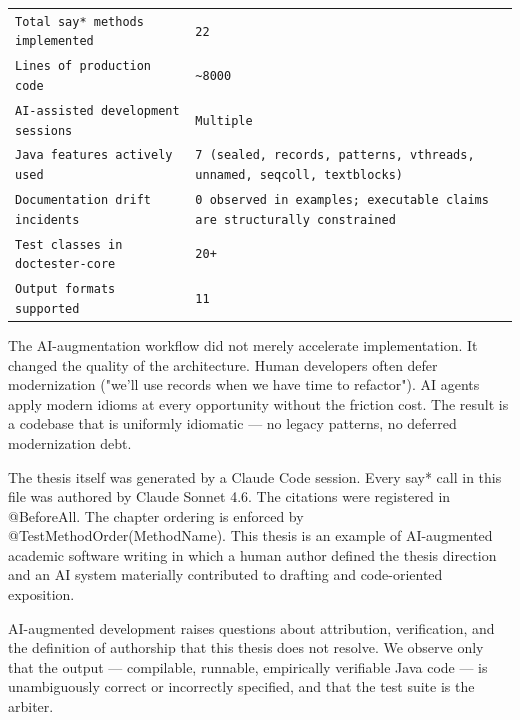 \documentclass[11pt]{article}
\begin{document}
\begin{table}[h]
\centering
\begin{tabular}{|l|l|}
\hline
\texttt{Total say* methods implemented} & \texttt{22} \\
\texttt{Lines of production code} & \texttt{\textasciitilde{}8000} \\
\texttt{AI-assisted development sessions} & \texttt{Multiple} \\
\texttt{Java features actively used} & \texttt{7 (sealed, records, patterns, vthreads, unnamed, seqcoll, textblocks)} \\
\texttt{Documentation drift incidents} & \texttt{0 observed in examples; executable claims are structurally constrained} \\
\texttt{Test classes in doctester-core} & \texttt{20+} \\
\texttt{Output formats supported} & \texttt{11} \\
\hline
\end{tabular}
\end{table}


The AI-augmentation workflow did not merely accelerate implementation. It changed the quality of the architecture. Human developers often defer modernization ("we'll use records when we have time to refactor"). AI agents apply modern idioms at every opportunity without the friction cost. The result is a codebase that is uniformly idiomatic — no legacy patterns, no deferred modernization debt.

\begin{tcolorbox}[colback=notebg,colframe=blue!50!black,title={\textbf{Note}}]
The thesis itself was generated by a Claude Code session. Every say* call in this file was authored by Claude Sonnet 4.6. The citations were registered in @BeforeAll. The chapter ordering is enforced by @TestMethodOrder(MethodName). This thesis is an example of AI-augmented academic software writing in which a human author defined the thesis direction and an AI system materially contributed to drafting and code-oriented exposition.
\end{tcolorbox}


\begin{tcolorbox}[colback=warnbg,colframe=red!50!black,title={\textbf{Warning}}]
AI-augmented development raises questions about attribution, verification, and the definition of authorship that this thesis does not resolve. We observe only that the output — compilable, runnable, empirically verifiable Java code — is unambiguously correct or incorrectly specified, and that the test suite is the arbiter.
\end{tcolorbox}
\end{document}
